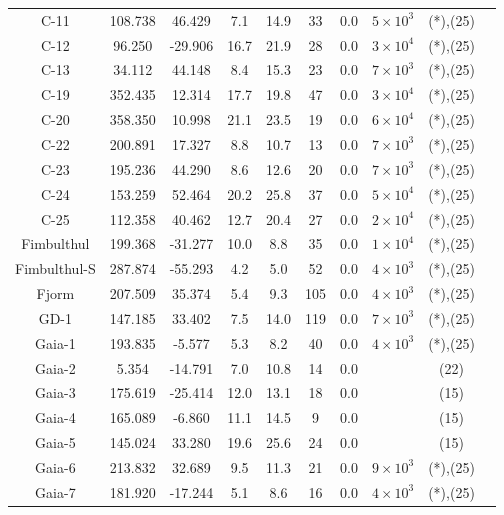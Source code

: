 \begin{table}
\begin{tabular}{cSSSSSSccc}
C-11 & 108.738 & 46.429 & 7.1 & 14.9 & 33 & 0.0 & $5 \times 10^{3}$ & (*),(25) \\
C-12 & 96.250 & -29.906 & 16.7 & 21.9 & 28 & 0.0 & $3 \times 10^{4}$ & (*),(25) \\
C-13 & 34.112 & 44.148 & 8.4 & 15.3 & 23 & 0.0 & $7 \times 10^{3}$ & (*),(25) \\
C-19 & 352.435 & 12.314 & 17.7 & 19.8 & 47 & 0.0 & $3 \times 10^{4}$ & (*),(25) \\
C-20 & 358.350 & 10.998 & 21.1 & 23.5 & 19 & 0.0 & $6 \times 10^{4}$ & (*),(25) \\
C-22 & 200.891 & 17.327 & 8.8 & 10.7 & 13 & 0.0 & $7 \times 10^{3}$ & (*),(25) \\
C-23 & 195.236 & 44.290 & 8.6 & 12.6 & 20 & 0.0 & $7 \times 10^{3}$ & (*),(25) \\
C-24 & 153.259 & 52.464 & 20.2 & 25.8 & 37 & 0.0 & $5 \times 10^{4}$ & (*),(25) \\
C-25 & 112.358 & 40.462 & 12.7 & 20.4 & 27 & 0.0 & $2 \times 10^{4}$ & (*),(25) \\
Fimbulthul & 199.368 & -31.277 & 10.0 & 8.8 & 35 & 0.0 & $1 \times 10^{4}$ & (*),(25) \\
Fimbulthul-S & 287.874 & -55.293 & 4.2 & 5.0 & 52 & 0.0 & $4 \times 10^{3}$ & (*),(25) \\
Fjorm & 207.509 & 35.374 & 5.4 & 9.3 & 105 & 0.0 & $4 \times 10^{3}$ & (*),(25) \\
GD-1 & 147.185 & 33.402 & 7.5 & 14.0 & 119 & 0.0 & $7 \times 10^{3}$ & (*),(25) \\
Gaia-1 & 193.835 & -5.577 & 5.3 & 8.2 & 40 & 0.0 & $4 \times 10^{3}$ & (*),(25) \\
Gaia-2 & 5.354 & -14.791 & 7.0 & 10.8 & 14 & 0.0 & & (22) \\
Gaia-3 & 175.619 & -25.414 & 12.0 & 13.1 & 18 & 0.0 & & (15) \\
Gaia-4 & 165.089 & -6.860 & 11.1 & 14.5 & 9 & 0.0 & & (15) \\
Gaia-5 & 145.024 & 33.280 & 19.6 & 25.6 & 24 & 0.0 & & (15) \\
Gaia-6 & 213.832 & 32.689 & 9.5 & 11.3 & 21 & 0.0 & $9 \times 10^{3}$ & (*),(25) \\
Gaia-7 & 181.920 & -17.244 & 5.1 & 8.6 & 16 & 0.0 & $4 \times 10^{3}$ & (*),(25) \\
\hline \hline
\end{tabular}
\end{table}
